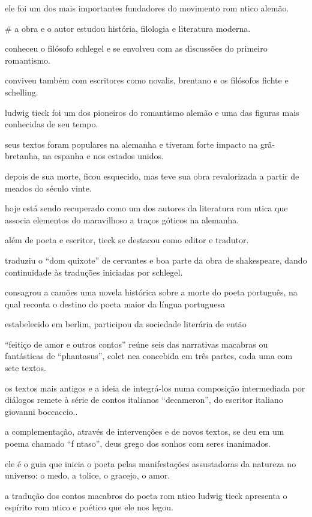 ele foi um dos mais importantes fundadores do movimento rom ntico alemão. 


# a obra e o autor
estudou história, filologia e literatura moderna.

conheceu o filósofo schlegel e se envolveu com as discussões do primeiro romantismo. 

conviveu também com escritores como novalis, brentano e os filósofos fichte e schelling. 

ludwig tieck foi um dos pioneiros do romantismo alemão e uma das figuras mais conhecidas de seu tempo. 

seus textos foram populares na alemanha e tiveram forte impacto na grã-bretanha, na espanha e nos estados unidos.

depois de sua morte, ficou esquecido, mas teve sua obra revalorizada a partir de meados do século vinte. 

hoje está sendo recuperado como um dos autores  da literatura rom ntica que associa elementos do maravilhoso a traços góticos na alemanha.

além de poeta e escritor, tieck se destacou como editor e tradutor.

traduziu o “dom quixote” de cervantes e boa parte da obra de shakespeare, dando continuidade às traduções iniciadas por schlegel.

consagrou a camões uma novela histórica sobre a morte do poeta português, na qual reconta o destino do poeta maior da língua portuguesa 

estabelecido em berlim, participou da sociedade literária de então 

“feitiço de amor e outros contos” reúne seis das narrativas macabras ou fantásticas de “phantasus”, colet nea concebida em três partes, cada uma com sete textos. 

os textos mais antigos e a ideia de integrá-los numa composição intermediada por diálogos remete à série de contos italianos “decameron”, do escritor italiano giovanni boccaccio.. 

a complementação, através de intervenções e de novos textos, se deu em um poema chamado “f ntaso”, deus grego dos sonhos com seres inanimados. 

ele é o guia que inicia o poeta pelas manifestações assustadoras da natureza no universo: o medo, a tolice, o gracejo, o amor.

a tradução dos contos macabros do poeta rom ntico ludwig tieck apresenta o espírito rom ntico e poético que ele nos legou. 

